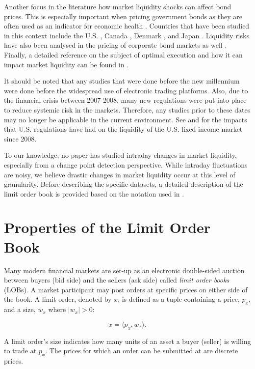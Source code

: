 Another focus in the literature how market liquidity shocks can affect bond prices. This is especially important when pricing government bonds as they are often used as an indicator for economic health \cite{zaloom2009read}. Countries that have been studied in this context include the U.S. \cite{mccauley2000iv}, Canada \cite{gungor2017has}, Denmark \cite{dick2013funding}, and Japan \cite{sakiyama2016market}. Liquidity risks have also been analysed in the pricing of corporate bond markets as well \cite{de2012liquidity}. Finally, a detailed reference on the subject of optimal execution and how it can impact market liquidity can be found in \cite{gueant2016financial}.

It should be noted that any studies that were done before the new millennium were done before the widespread use of electronic trading platforms. Also, due to the financial crisis between 2007-2008, many new regulations were put into place to reduce systemic risk in the markets. Therefore, any studies prior to these dates may no longer be applicable in the current environment. See  \cite{adrian2017market} and \cite{trebbi2019regulation} for the impacts that U.S. regulations have had on the liquidity of the U.S. fixed income market since 2008.

To our knowledge, no paper has studied intraday changes in market liquidity, especially from a change point detection perspective. While intraday fluctuations are noisy, we believe drastic changes in market liquidity occur at this level of granularity. Before describing the specific datasets, a detailed description of the limit order book is provided based on the notation used in \cite{gould2016queue}. 

\section{Properties of the Limit Order Book}
\label{prop_book}
Many modern financial markets are set-up as an electronic double-sided auction between buyers (bid side) and the sellers (ask side) called \textit{limit order books} (LOBs). A market participant may post orders at specific prices on either side of the book. A limit order, denoted by $x$, is defined as a tuple containing a price, $p_x$, and a size, $w_x$ where $|w_x|>0$:

\begin{equation}
x = \langle p_x, w_x \rangle.
\end{equation}

A limit order's size indicates how many units of an asset a buyer (seller) is willing to trade at $p_x$. The prices for which an order can be submitted at are discrete prices. 

